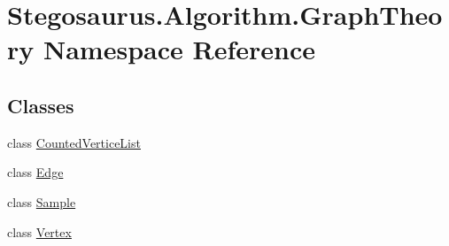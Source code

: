 \hypertarget{namespace_stegosaurus_1_1_algorithm_1_1_graph_theory}{}\section{Stegosaurus.\+Algorithm.\+Graph\+Theory Namespace Reference}
\label{namespace_stegosaurus_1_1_algorithm_1_1_graph_theory}
\subsection*{Classes}
\begin{DoxyCompactItemize}
\item 
class \hyperlink{class_stegosaurus_1_1_algorithm_1_1_graph_theory_1_1_counted_vertice_list}{Counted\+Vertice\+List}
\item 
class \hyperlink{class_stegosaurus_1_1_algorithm_1_1_graph_theory_1_1_edge}{Edge}
\item 
class \hyperlink{class_stegosaurus_1_1_algorithm_1_1_graph_theory_1_1_sample}{Sample}
\item 
class \hyperlink{class_stegosaurus_1_1_algorithm_1_1_graph_theory_1_1_vertex}{Vertex}
\end{DoxyCompactItemize}
